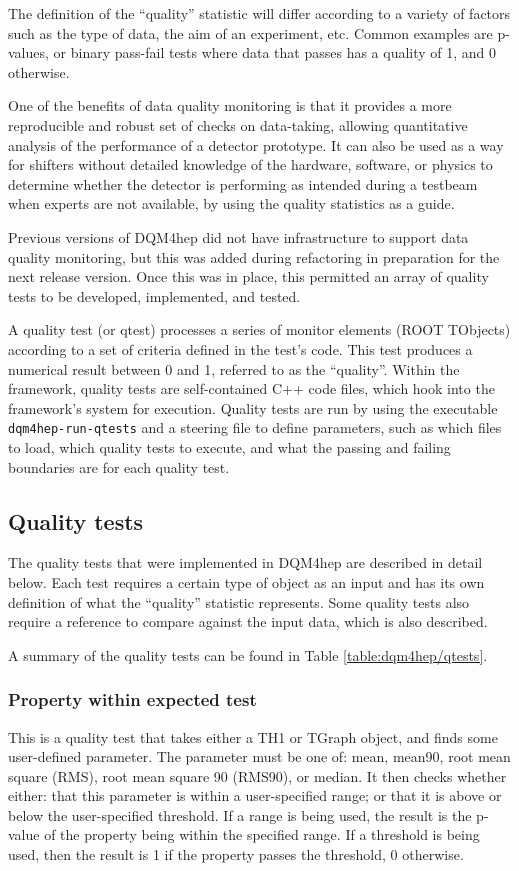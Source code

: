 The definition of the ``quality'' statistic will differ according to a variety of factors such as the type of data, the aim of an experiment, etc. Common examples are p-values, or binary pass-fail tests where data that passes has a quality of 1, and 0 otherwise.

One of the benefits of data quality monitoring is that it provides a more reproducible and robust set of checks on data-taking, allowing quantitative analysis of the performance of a detector prototype. It can also be used as a way for shifters without detailed knowledge of the hardware, software, or physics to determine whether the detector is performing as intended during a testbeam when experts are not available, by using the quality statistics as a guide.

Previous versions of \acrshort{DQM4hep} did not have infrastructure to support data quality monitoring, but this was added during refactoring in preparation for the next release version. Once this was in place, this permitted an array of quality tests to be developed, implemented, and tested. 

A quality test (or \acrshort{qtest}) processes a series of monitor elements (ROOT TObjects) according to a set of criteria defined in the test's code. This test produces a numerical result between 0 and 1, referred to as the ``quality''. Within the framework, quality tests are self-contained C++ code files, which hook into the framework's system for execution. Quality tests are run by using the executable \texttt{dqm4hep-run-qtests} and a steering file to define parameters, such as which files to load, which quality tests to execute, and what the passing and failing boundaries are for each quality test. 

\subsection{Quality tests}
The quality tests that were implemented in \acrshort{DQM4hep} are described in detail below. Each test requires a certain type of object as an input and has its own definition of what the ``quality'' statistic represents. Some quality tests also require a reference to compare against the input data, which is also described.

A summary of the quality tests can be found in Table \ref{table:dqm4hep/qtests}.

\subsubsection{Property within expected test}
\label{sec:property-qtest}
This is a quality test that takes either a TH1 or TGraph object, and finds some user-defined parameter. The parameter must be one of: mean, mean90, root mean square (RMS), root mean square 90 (RMS90), or median. It then checks whether either: that this parameter is within a user-specified range; or that it is above or below the user-specified threshold. If a range is being used, the result is the p-value of the property being within the specified range. If a threshold is being used, then the result is 1 if the property passes the threshold, 0 otherwise.

